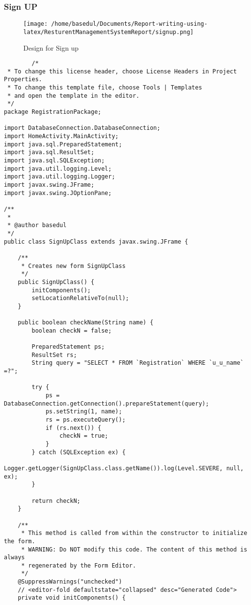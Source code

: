 \documentclass[12pt,a4paper]{article}
\begin{document}
	\subsubsection{Sign UP}
		\begin{figure}[H]
		\centering
		\texttt{[image: /home/basedul/Documents/Report-writing-using-latex/ResturentManagementSystemReport/signup.png]}
		\caption{Design for Sign up}
		\label{fig:signin} 
\end{figure}
	\begin{lstlisting}
		/*
 * To change this license header, choose License Headers in Project Properties.
 * To change this template file, choose Tools | Templates
 * and open the template in the editor.
 */
package RegistrationPackage;

import DatabaseConnection.DatabaseConnection;
import HomeActivity.MainActivity;
import java.sql.PreparedStatement;
import java.sql.ResultSet;
import java.sql.SQLException;
import java.util.logging.Level;
import java.util.logging.Logger;
import javax.swing.JFrame;
import javax.swing.JOptionPane;

/**
 *
 * @author basedul
 */
public class SignUpClass extends javax.swing.JFrame {

    /**
     * Creates new form SignUpClass
     */
    public SignUpClass() {
        initComponents();
        setLocationRelativeTo(null);
    }
    
    public boolean checkName(String name) {
        boolean checkN = false;

        PreparedStatement ps;
        ResultSet rs;
        String query = "SELECT * FROM `Registration` WHERE `u_u_name` =?";

        try {
            ps = DatabaseConnection.getConnection().prepareStatement(query);
            ps.setString(1, name);
            rs = ps.executeQuery();
            if (rs.next()) {
                checkN = true;
            }
        } catch (SQLException ex) {
            Logger.getLogger(SignUpClass.class.getName()).log(Level.SEVERE, null, ex);
        }

        return checkN;
    }

    /**
     * This method is called from within the constructor to initialize the form.
     * WARNING: Do NOT modify this code. The content of this method is always
     * regenerated by the Form Editor.
     */
    @SuppressWarnings("unchecked")
    // <editor-fold defaultstate="collapsed" desc="Generated Code">                          
    private void initComponents() {


\end{lstlisting}
\end{document}

